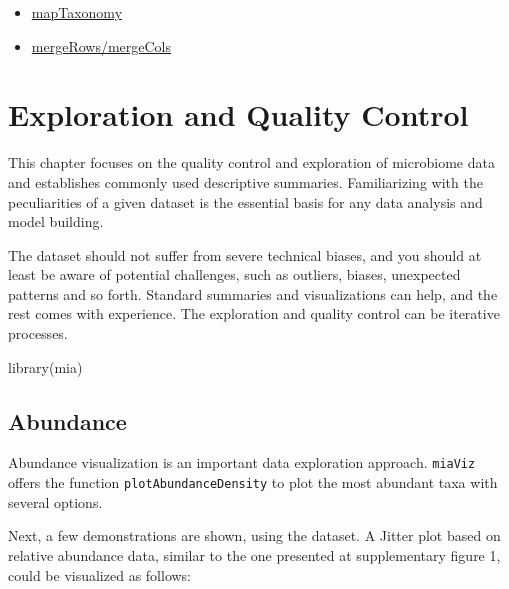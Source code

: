 \documentclass[
]{book}
\newenvironment{Shaded}{\begin{snugshade}}{\end{snugshade}}
\newcommand{\FunctionTok}[1]{\textcolor[rgb]{0.00,0.00,0.00}{#1}}
\newcommand{\NormalTok}[1]{#1}
\providecommand{\tightlist}{%
  \setlength{\itemsep}{0pt}\setlength{\parskip}{0pt}}
\begin{document}
\begin{itemize}
\tightlist
\item
  \href{https://microbiome.github.io/mia/reference/taxonomy-methods.html}{mapTaxonomy}
\item
  \href{https://microbiome.github.io/mia/reference/merge-methods.html}{mergeRows/mergeCols}
\end{itemize}

\hypertarget{quality-control}{%
\chapter{Exploration and Quality Control}\label{quality-control}}

This chapter focuses on the quality control and exploration of
microbiome data and establishes commonly used descriptive
summaries. Familiarizing with the peculiarities of a given dataset is
the essential basis for any data analysis and model building.

The dataset should not suffer from severe technical biases, and you
should at least be aware of potential challenges, such as outliers,
biases, unexpected patterns and so forth. Standard summaries and
visualizations can help, and the rest comes with experience. The
exploration and quality control can be iterative processes.

\begin{Shaded}
\begin{Highlighting}[]
\FunctionTok{library}\NormalTok{(mia)}
\end{Highlighting}
\end{Shaded}

\hypertarget{abundance}{%
\section{Abundance}\label{abundance}}

Abundance visualization is an important data exploration
approach. \texttt{miaViz} offers the function \texttt{plotAbundanceDensity} to plot
the most abundant taxa with several options.

Next, a few demonstrations are shown, using the \citep{Lahti2014}
dataset. A Jitter plot based on relative abundance data, similar to
the one presented at \citep{Salosensaari2021} supplementary figure 1, could
be visualized as follows:
\end{document}
